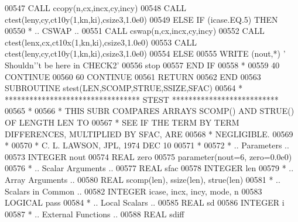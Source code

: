 \begin{DoxyCode}
00547                \textcolor{keyword}{CALL }ccopy(n,cx,incx,cy,incy)
00548                \textcolor{keyword}{CALL }ctest(leny,cy,ct10y(1,kn,ki),csize3,1.0e0)
00549             \textcolor{keywordflow}{ELSE} \textcolor{keywordflow}{IF} (icase.EQ.5) \textcolor{keywordflow}{THEN}
00550 \textcolor{comment}{*              .. CSWAP ..}
00551                \textcolor{keyword}{CALL }cswap(n,cx,incx,cy,incy)
00552                \textcolor{keyword}{CALL }ctest(lenx,cx,ct10x(1,kn,ki),csize3,1.0e0)
00553                \textcolor{keyword}{CALL }ctest(leny,cy,ct10y(1,kn,ki),csize3,1.0e0)
00554             \textcolor{keywordflow}{ELSE}
00555                \textcolor{keyword}{WRITE} (nout,*) \textcolor{stringliteral}{' Shouldn'}\textcolor{stringliteral}{'t be here in CHECK2'}
00556                stop
00557 \textcolor{keywordflow}{            END IF}
00558 \textcolor{comment}{*}
00559    40    \textcolor{keywordflow}{CONTINUE}
00560    60 \textcolor{keywordflow}{CONTINUE}
00561       \textcolor{keywordflow}{RETURN}
00562 \textcolor{keyword}{      END}
00563 \textcolor{keyword}{      SUBROUTINE }stest(LEN,SCOMP,STRUE,SSIZE,SFAC)
00564 \textcolor{comment}{*     ********************************* STEST **************************}
00565 \textcolor{comment}{*}
00566 \textcolor{comment}{*     THIS SUBR COMPARES ARRAYS  SCOMP() AND STRUE() OF LENGTH LEN TO}
00567 \textcolor{comment}{*     SEE IF THE TERM BY TERM DIFFERENCES, MULTIPLIED BY SFAC, ARE}
00568 \textcolor{comment}{*     NEGLIGIBLE.}
00569 \textcolor{comment}{*}
00570 \textcolor{comment}{*     C. L. LAWSON, JPL, 1974 DEC 10}
00571 \textcolor{comment}{*}
00572 \textcolor{comment}{*     .. Parameters ..}
00573       \textcolor{keywordtype}{INTEGER}          nout
00574       \textcolor{keywordtype}{REAL}             zero
00575       parameter(nout=6, zero=0.0e0)
00576 \textcolor{comment}{*     .. Scalar Arguments ..}
00577       \textcolor{keywordtype}{REAL}             sfac
00578       \textcolor{keywordtype}{INTEGER}          len
00579 \textcolor{comment}{*     .. Array Arguments ..}
00580       \textcolor{keywordtype}{REAL}             scomp(len), ssize(len), strue(len)
00581 \textcolor{comment}{*     .. Scalars in Common ..}
00582       \textcolor{keywordtype}{INTEGER}          icase, incx, incy, mode, n
00583       \textcolor{keywordtype}{LOGICAL}          pass
00584 \textcolor{comment}{*     .. Local Scalars ..}
00585       \textcolor{keywordtype}{REAL}             sd
00586       \textcolor{keywordtype}{INTEGER}          i
00587 \textcolor{comment}{*     .. External Functions ..}
00588       \textcolor{keywordtype}{REAL}             sdiff

\end{DoxyCode}
